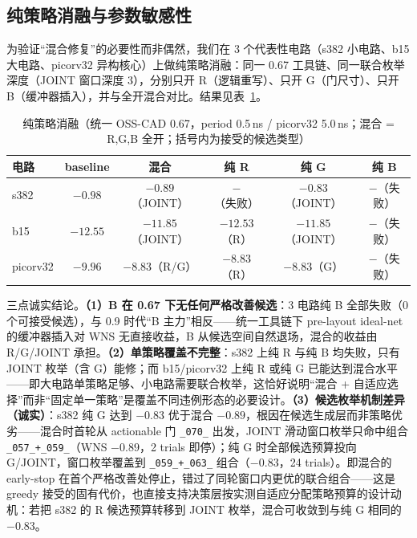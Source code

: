 \documentclass[journal]{IEEEtran}
\begin{document}
\subsection{纯策略消融与参数敏感性}\label{sec:ablation}

为验证“混合修复”的必要性而非偶然，我们在 3 个代表性电路（s382 小电路、b15 大电路、picorv32 异构核心）上做纯策略消融：同一 0.67 工具链、同一联合枚举深度（JOINT 窗口深度 3），分别只开 R（逻辑重写）、只开 G（门尺寸）、只开 B（缓冲器插入），并与全开混合对比。结果见表~\ref{tab:ablation}。

\begin{table}[!t]
\centering
\caption{纯策略消融（统一 OSS-CAD 0.67，period 0.5\,ns / picorv32 5.0\,ns；混合 = R,G,B 全开；括号内为接受的候选类型）}
\label{tab:ablation}
\scriptsize
\setlength{\tabcolsep}{3pt}
\begin{tabular}{lccccc}
\toprule
\textbf{电路} & \textbf{baseline} & \textbf{混合} & \textbf{纯 R} & \textbf{纯 G} & \textbf{纯 B} \\
\midrule
s382 & $-0.98$ & \textbf{$-0.89$}（JOINT） & $-$（失败） & $-0.83$（JOINT） & $-$（失败） \\
b15 & $-12.55$ & \textbf{$-11.85$}（JOINT） & $-12.53$（R） & \textbf{$-11.85$}（JOINT） & $-$（失败） \\
picorv32 & $-9.96$ & \textbf{$-8.83$}（R/G） & \textbf{$-8.83$}（R） & \textbf{$-8.83$}（G） & $-$（失败） \\
\bottomrule
\end{tabular}
\end{table}

三点诚实结论。\textbf{（1）B 在 0.67 下无任何严格改善候选}：3 电路纯 B 全部失败（0 个可接受候选），与 0.9 时代“B 主力”相反——统一工具链下 pre-layout ideal-net 的缓冲器插入对 WNS 无直接收益，B 从候选空间自然退场，混合的收益由 R/G/JOINT 承担。\textbf{（2）单策略覆盖不完整}：s382 上纯 R 与纯 B 均失败，只有 JOINT 枚举（含 G）能修；而 b15/picorv32 上纯 R 或纯 G 已能达到混合水平——即大电路单策略足够、小电路需要联合枚举，这恰好说明“混合 + 自适应选择”而非“固定单一策略”是覆盖不同违例形态的必要设计。\textbf{（3）候选枚举机制差异（诚实）}：s382 纯 G 达到 $-0.83$ 优于混合 $-0.89$，根因在候选生成层而非策略优劣——混合时首轮从 actionable 门 \texttt{\_070\_} 出发，JOINT 滑动窗口枚举只命中组合 \texttt{\_057\_+\_059\_}（WNS $-0.89$，2 trials 即停）；纯 G 时全部候选预算投向 G/JOINT，窗口枚举覆盖到 \texttt{\_059\_+\_063\_} 组合（$-0.83$，24 trials）。即混合的 early-stop 在首个严格改善处停止，错过了同轮窗口内更优的联合组合——这是 greedy 接受的固有代价，也直接支持决策层按实测自适应分配策略预算的设计动机：若把 s382 的 R 候选预算转移到 JOINT 枚举，混合可收敛到与纯 G 相同的 $-0.83$。
\end{document}
